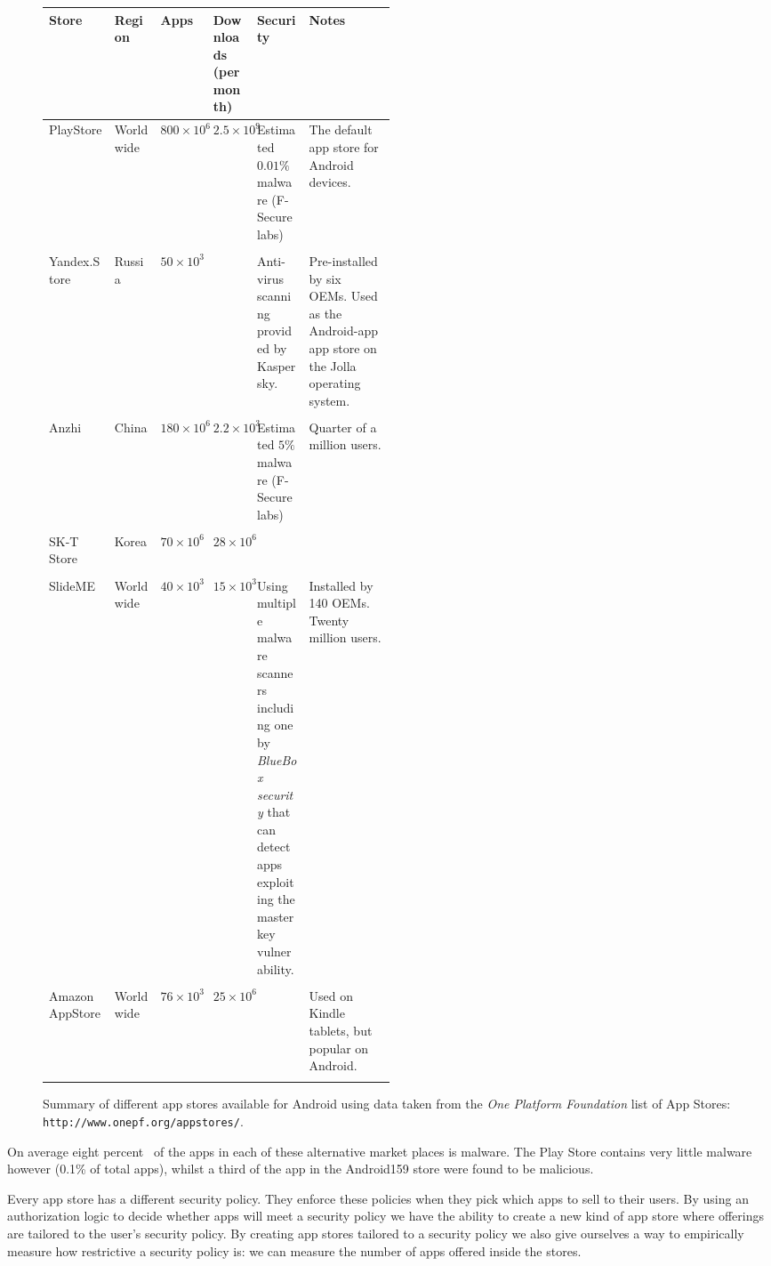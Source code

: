 \documentclass[a4paper]{article}
\begin{document}
\begin{figure}\centering\footnotesize
  \begin{tabular}{l l l p{0.1\linewidth} p{0.15\linewidth} p{0.25\linewidth}}
    \toprule
    Store & Region & Apps & Downloads (per month) & Security & Notes \\
    \midrule
    PlayStore & Worldwide & $800\times10^6$ & $2.5\times10^9$ & Estimated $0.01\%$ malware (F-Secure labs) & The default app store for Android devices.\\
    \addlinespace \\
    Yandex.Store & Russia & $50\times10^3$ & & Anti-virus scanning provided by Kaspersky. & Pre-installed by six OEMs. Used as the Android-app app store on the Jolla operating system. \\
    \addlinespace \\
    Anzhi & China & $180\times10^6$ & $2.2\times10^3$ & Estimated $5\%$ malware (F-Secure labs) & Quarter of a million users.\\
    \addlinespace \\
    SK-T Store & Korea & $70\times10^6$ & $28\times10^6$ & & \\
    \addlinespace \\
    SlideME & Worldwide & $40\times10^3$ & $15\times10^3$ & Using multiple malware scanners including one by \emph{BlueBox security} that can detect apps exploiting the master key vulnerability. & Installed by 140 OEMs. Twenty million users. \\
    \addlinespace \\
    Amazon AppStore & Worldwide & $76\times10^3$ & $25\times10^6$ & & Used on
    Kindle tablets, but popular on Android. \\
    \bottomrule
    \\
  \end{tabular}
  \caption{Summary of different app stores available for Android using data
    taken from the \emph{One Platform Foundation} list of App Stores:
    \texttt{http://www.onepf.org/appstores/}.}
    \label{tab:stores}
  \end{figure}

On average eight percent~\cite{AQUILINO:2013wr} of the apps in each of these
alternative market places is malware. The Play Store contains very little
malware however (0.1\% of total apps), whilst a third of the app in the
Android159 store were found to be malicious.

Every app store has a different security policy.  They enforce these
policies when they pick which apps to sell to their users.  By using an
authorization logic to decide whether apps will meet a security policy we have
the ability to create a new kind of app store where offerings are tailored to
the user's security policy.  By creating app stores tailored to a security
policy we also give ourselves a way to empirically measure how restrictive a
security policy is: we can measure the number of apps offered inside the stores.
\end{document}
